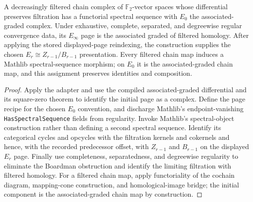 \begin{theorem}
  \label{thm:filtered-complex-to-spectral-sequence}
  \notready
  A decreasingly filtered chain complex of $\mathbb F_2$-vector spaces whose
  differential preserves filtration has a functorial spectral sequence with
  $E_0$ the associated-graded complex.  Under exhaustive, complete,
  separated, and degreewise regular convergence data, its $E_\infty$ page is
  the associated graded of filtered homology.  After applying the stored
  displayed-page reindexing, the construction supplies the chosen
  $E_r\cong Z_{r-1}/B_{r-1}$ presentation.  Every filtered chain map induces a Mathlib
  spectral-sequence morphism; on $E_0$ it is the associated-graded chain map,
  and this assignment preserves identities and composition.
\end{theorem}

\begin{proof}
  Apply the adapter and use the compiled associated-graded differential and its
  square-zero theorem to identify the initial page as a complex.  Define the
  page recipe for the chosen $E_0$ convention,
  and discharge Mathlib's endpoint-vanishing
  \texttt{HasSpectralSequence} fields from regularity.  Invoke Mathlib's
  spectral-object construction rather than defining a second spectral
  sequence.  Identify its categorical cycles and opcycles with the filtration
  kernels and cokernels and hence, with the recorded predecessor offset, with
  $Z_{r-1}$ and $B_{r-1}$ on the displayed $E_r$ page.  Finally use
  completeness, separatedness, and degreewise regularity to eliminate the
  Boardman obstruction and identify the limiting filtration with filtered
  homology.  For a filtered chain map, apply functoriality of the cochain
  diagram, mapping-cone construction, and homological-image bridge; the initial
  component is the associated-graded chain map by construction.
\end{proof}


